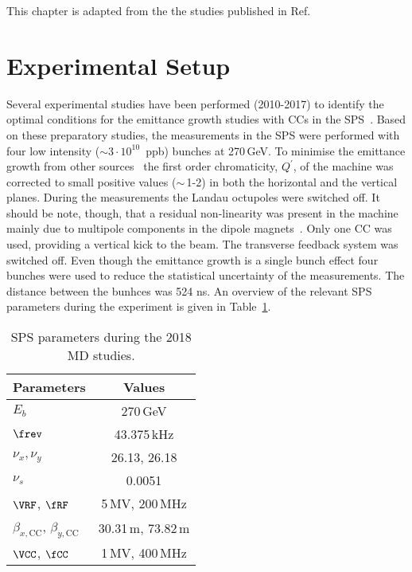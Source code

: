  \newpage 
 This chapter is adapted from the the studies published in Ref.~\cite{Triantafyllou}

 \section{Experimental Setup} %

Several experimental studies have been performed (2010-2017) to identify the optimal conditions for the emittance growth studies with CCs in the SPS~\cite{Calaga:1451286, Antoniou:2649815}. Based on these preparatory studies, the measurements in the SPS were performed with four low intensity ($\sim 3 \cdot 10^{10}$\, ppb) bunches at 270\,GeV. To minimise the emittance growth from other sources~\cite{Antoniou:2649815} the first order chromaticity, $Q^\prime$, of the machine was corrected to small positive values ($\sim$\,1-2) in both the horizontal and the vertical planes. During the measurements the Landau octupoles were switched off. It should be note, though, that a residual non-linearity was present in the machine mainly due to multipole components in the dipole magnets~\cite{Carlà:2664976, Alekou:2640326}. Only one CC was used, providing a vertical kick to the beam. The transverse feedback system was switched off. Even though the emittance growth is a single bunch effect four bunches were used to reduce the statistical uncertainty of the measurements. The distance between the bunhces was 524 ns. An overview of the relevant SPS parameters during the experiment is given in Table~\ref{tab:SPS_MD_params}. 


\begin{table}[!hbt]
    \centering
    \caption{SPS parameters during the 2018 MD studies.}
    \begin{tabular}{lc}
        \toprule
        \textbf{Parameters} & \textbf{Values}\\
        \midrule
           $E_b$  & 270\,GeV   \\ %
           $\frev$  & 43.375\,kHz  \\ %
           $\nu_x, \nu_y$    & 26.13, 26.18  \\ %
            $\nu_s$ & 0.0051   \\
            $\VRF$, $\fRF$ & 5\,MV, 200\,MHz \\
            $\beta_{x, \text{CC}}$, $\beta_{y,\text{CC}}$ &  30.31\,m, 73.82\,m \\
            $\VCC$, $\fCC$ & 1\,MV, 400\,MHz \\
       \bottomrule
    \end{tabular}
    \label{tab:SPS_MD_params}
 \end{table}

